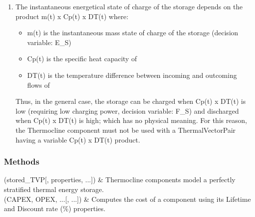 \documentclass[letterpaper,10pt,english]{sphinxmanual}
\begin{document}
\begin{fulllineitems}
\begin{fulllineitems}
\begin{enumerate}
\item {} 
\sphinxAtStartPar
The instantaneous energetical state of charge of the storage depends on the product m(t) x Cp(t) x DT(t) where:
\begin{itemize}
\item {} 
\sphinxAtStartPar
m(t) is the instantaneous mass state of charge of the storage (decision variable: E\_S)

\item {} 
\sphinxAtStartPar
Cp(t) is the specific heat capacity of 

\item {} 
\sphinxAtStartPar
DT(t) is the temperature difference between incoming and outcoming flows of 

\end{itemize}

\sphinxAtStartPar
Thus, in the general case, the storage can be charged when Cp(t) x DT(t) is low (requiring low charging power, decision variable: F\_S)
and discharged when Cp(t) x DT(t) is high; which has no physical meaning.
For this reason, the Thermocline component must not be used with a ThermalVectorPair  having a variable Cp(t) x DT(t) product.

\end{enumerate}

\end{fulllineitems}

\subsubsection*{Methods}


\begin{savenotes}\sphinxattablestart
\centering
\begin{tabulary}{\linewidth}[t]{}
\hline

\sphinxAtStartPar
{\hyperref[\detokenize{generated/tamos.storage.Thermocline:tamos.storage.Thermocline.__init__}]{}}(stored\_TVP{[}, properties, ...{]})
&
\sphinxAtStartPar
Thermocline components model a perfectly stratified thermal energy storage.
\\
\hline
\sphinxAtStartPar
{\hyperref[\detokenize{generated/tamos.storage.Thermocline:tamos.storage.Thermocline.compute_actualized_cost}]{}}(CAPEX, OPEX, ...{[}, ...{]})
&
\sphinxAtStartPar
Computes the cost of a component using its \textquotesingle{}Lifetime\textquotesingle{} and \textquotesingle{}Discount rate (\%)\textquotesingle{} properties.
\\
\hline
\end{tabulary}
\par
\sphinxattableend\end{savenotes}

\end{fulllineitems}
\end{document}
